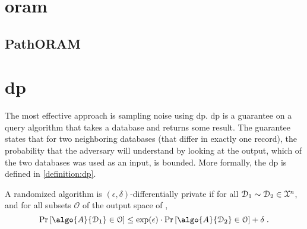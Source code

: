 	\section{\texorpdfstring{\acrlong{oram}}{Oblivious Random Access Machine}}

		\subsection{PathORAM}

	\section{\texorpdfstring{\acrlong{dp}}{Differential Privacy}}

		The most effective approach is sampling noise using \acrfull{dp}.
		\acrshort{dp} is a guarantee on a query algorithm that takes a database and returns some result.
		The guarantee states that for two neighboring databases (that differ in exactly one record), the probability that the adversary will understand by looking at the output, which of the two databases was used as an input, is bounded.
		More formally, the \acrlong{dp} is defined in \cref{definition:dp}.

		\begin{definition}\label{definition:dp}
			A randomized algorithm  is $(\epsilon, \delta)$-differentially private if for all $\mathcal{D}_1 \sim \mathcal{D}_2 \in \mathcal{X}^{n}$, and for all subsets $\mathcal{O}$ of the output space of ,
			\[
				\probability{ \algo{A}{ \database_1 } \in \mathcal{O} } \leq \exp(\epsilon) \cdot \probability{ \algo{A}{ \database_2 } \in \mathcal{O} } + \delta \; .
			\]
		\end{definition}

